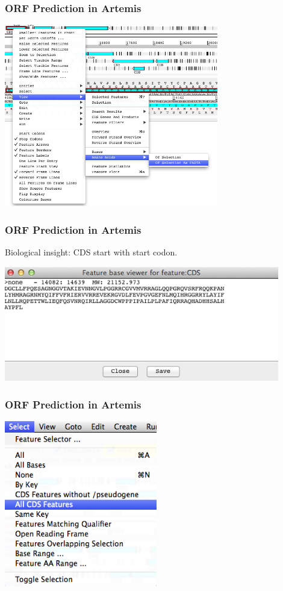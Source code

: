 \documentclass[table]{beamer}
\begin{document}
    \begin{frame}
      \frametitle{ORF Prediction in Artemis}    
      \begin{center}
        \includegraphics[width=0.7\textwidth]{images/artemis_orf5}     
      \end{center}
    \end{frame}

    \begin{frame}
      \frametitle{ORF Prediction in Artemis}
      Biological insight: CDS start with start codon.
      \begin{center}
        \includegraphics[width=0.9\textwidth]{images/artemis_orf6}     
      \end{center}
    \end{frame}

    \begin{frame}
      \frametitle{ORF Prediction in Artemis}    
      \begin{center}
        \includegraphics[width=0.5\textwidth]{images/artemis_orf7}     
      \end{center}
    \end{frame}
\end{document}
